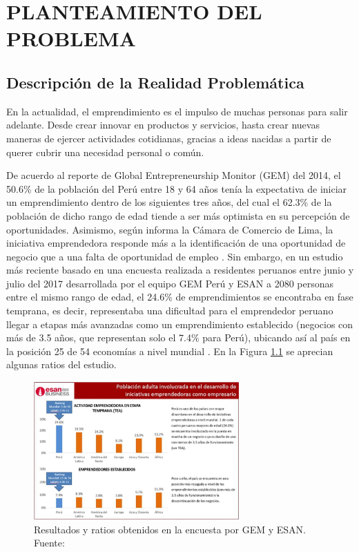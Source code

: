 \chapter{PLANTEAMIENTO DEL PROBLEMA}
\section{Descripción de la Realidad Problemática}

En la actualidad, el emprendimiento es el impulso de muchas personas para salir adelante. Desde crear innovar en productos y servicios, hasta crear nuevas maneras de ejercer actividades cotidianas, gracias a ideas nacidas a partir de querer cubrir una necesidad personal o común.

De acuerdo al reporte de Global Entrepreneurship Monitor (GEM) del 2014, el 50.6\% de la población del Perú entre 18 y 64 años tenía la expectativa de iniciar un emprendimiento dentro de los siguientes tres años, del cual el 62.3\% de la población de dicho rango de edad tiende a ser más optimista en su percepción de oportunidades. Asimismo, según informa la Cámara de Comercio de Lima, la iniciativa emprendedora responde más a la identificación de una oportunidad de negocio que a una falta de oportunidad de empleo \parencite{cr_gestion2015emprendper}. Sin embargo, en un estudio más reciente basado en una encuesta realizada a residentes peruanos entre junio y julio del 2017 desarrollada por el equipo GEM Perú y ESAN a 2080 personas entre el mismo rango de edad, el 24.6\% de emprendimientos se encontraba en fase temprana, es decir, representaba una dificultad para el emprendedor peruano llegar a etapas más avanzadas como un emprendimiento establecido (negocios con más de 3.5 años, que representan solo el 7.4\% para Perú), ubicando así al país en la posición 25 de 54 economías a nivel mundial \parencite{cr_gestion2018emprend}. En la Figura \ref{1:fig} se aprecian algunas ratios del estudio. %

\begin{figure}[h]
	\begin{center}
		\includegraphics[width=0.7\textwidth]{1/figures/cuadro_esan.jpg}
		\caption[Resultados y ratios obtenidos en la encuesta por GEM y ESAN]{Resultados y ratios obtenidos en la encuesta por GEM y ESAN.\\
		Fuente: \cite{cr_gestion2018emprend}}
		\label{1:fig}
	\end{center}
\end{figure}

